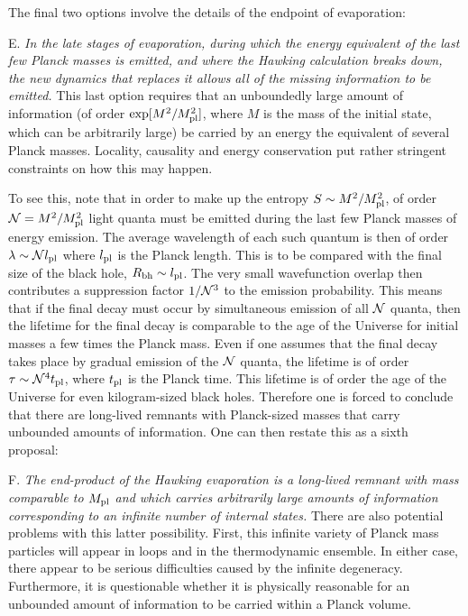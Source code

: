 The final two options involve the details of the endpoint of evaporation:

\itemskip
\item{E.}  {\it In the late stages of evaporation, during which the energy
equivalent of the last
few Planck masses is emitted, and where the Hawking calculation breaks down,
the new dynamics that replaces it
allows all of the missing information to be
emitted. }
\itemskip
This last option requires that an unboundedly large amount of
information (of order $\exp[{M^2/M_{\rm pl}^2}]$, where $M$
is the mass of the
initial state, which can be arbitrarily large) be
carried by an energy the equivalent of several Planck
masses.  Locality, causality and energy conservation put rather
stringent constraints on how this may happen.

To see this, note that in order to make up the entropy
$S\sim M^2/M_{\rm pl}^2$, of order ${\cal N} = M^2/M_{\rm pl}^2$ light quanta must
be emitted during the last few Planck masses of energy emission.  The
average wavelength of each such quantum is then of order $\lambda\sim
{\cal N}l_{\rm pl}$ where $l_{\rm pl}$ is the Planck length.  This is to be compared
with the final size of the black hole, $R_{\rm bh}\sim l_{\rm pl}$.  The
very small wavefunction overlap then contributes a suppression factor
$1/{\cal N}^3$ to the emission probability.  This means that if the final
decay must occur by simultaneous emission of all ${\cal N}$ quanta, then
the lifetime for the final decay is comparable to the age of the
Universe  for initial masses a few times the Planck
mass.  Even if one assumes that the final decay takes place by
gradual emission of the ${\cal N}$ quanta, the lifetime is of
order
$\tau \sim {\cal N}^4 t_{\rm pl}$, where $t_{\rm pl}$ is the Planck
time.  This lifetime is of order the age of the Universe for
even kilogram-sized black holes.
Therefore one is forced to conclude that there are long-lived
remnants with Planck-sized  masses that carry unbounded amounts of
information.  One can then restate this as a sixth proposal:

\itemskip
\item{F.}  {\it The end-product of the Hawking evaporation is a long-lived
remnant with mass comparable to $M_{\rm pl}$ and which carries arbitrarily
large amounts of information corresponding to an infinite number
of internal states.}
\itemskip
There are also potential problems with this latter possibility.
First, this infinite variety of Planck mass particles will appear in loops
and in the thermodynamic ensemble.  In either case, there appear to be serious
difficulties
caused by the infinite degeneracy.
Furthermore, it is questionable whether it is physically
reasonable for an unbounded amount of information to be carried
within a Planck volume.

